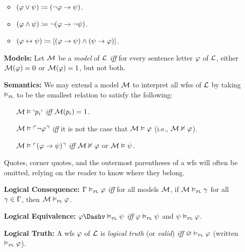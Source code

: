 \documentclass[a4paper, 11pt]{article} %
\begin{document}
\begin{enumerate}[leftmargin=1.2in]
	      \begin{itemize}\small
		      \item $(\varphi \vee \psi) \coloneq (\neg \varphi \rightarrow \psi)$.
		      \item $(\varphi\wedge \psi) \coloneq \neg(\varphi \rightarrow \neg\psi)$.
		      \item $(\varphi\leftrightarrow \psi) \coloneq [(\varphi\rightarrow \psi)\wedge(\psi\rightarrow \varphi)]$.
	      \end{itemize}
	\item[\bf Models:] Let $\mathcal{M}$ be a \textit{model} of $\mathcal{L}$ \textit{iff} for every sentence letter $\varphi$ of $\mathcal{L}$, either $\mathcal{M}(\varphi)=0$ or $\mathcal{M}(\varphi)=1$, but not both.
	\item[\bf Semantics:] We may extend a model $\mathcal{M}$ to interpret all wfss of $\mathcal{L}$ by taking $\vDash_{\textsc{pl}}$ to be the smallest relation to satisfy the following:
    \begin{itemize}[leftmargin=.15in]\small
      \item[] $\mathcal{M}\vDash `p_i`$ \textit{iff} $\mathcal{M}(p_i)=1$.
      \item[] $\mathcal{M}\vDash \ulcorner\neg \varphi\urcorner$ \textit{iff} it is not the case that $\mathcal{M}\vDash \varphi$ (i.e., $\mathcal{M}\nvDash \varphi$). %
      \item[] $\mathcal{M}\vDash \ulcorner(\varphi \rightarrow \psi)\urcorner$ \textit{iff} $\mathcal{M}\nvDash \varphi$ or $\mathcal{M}\vDash \psi$.
    \end{itemize}
    Quotes, corner quotes, and the outermost parentheses of a wfs will often be omitted, relying on the reader to know where they belong.
	\item[\bf Logical Consequence:] $\Gamma \vDash_{\textsc{pl}} \varphi$ \textit{iff} for all models $\mathcal{M}$, if $\mathcal{M}\vDash_{\textsc{pl}} \gamma$ for all $\gamma\in\Gamma$, then $\mathcal{M}\vDash_{\textsc{pl}} \varphi$.
	\item[\bf Logical Equivalence:] $\metaA \Dashv\PLmodels \metaB$ \textit{iff} $\varphi\vDash_{\textsc{pl}} \psi$ and $\psi\vDash_{\textsc{pl}} \varphi$.
	\item[\bf Logical Truth:] A wfs $\varphi$ of $\mathcal{L}$ is \textit{logical truth} (or \textit{valid}) \textit{iff} $\varnothing\vDash_{\textsc{pl}} \varphi$ (written $\vDash_{\textsc{pl}} \varphi$).
\end{enumerate}
\end{document}
